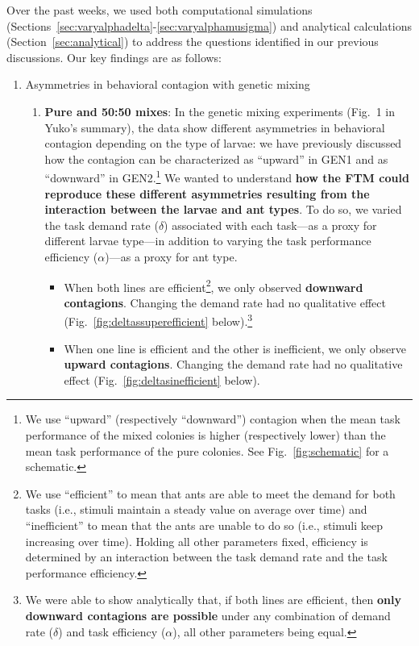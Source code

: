 \documentclass[11pt]{article}
\begin{document}
\noindent Over the past weeks, we used both computational simulations (Sections~\ref{sec:varyalphadelta}-\ref{sec:varyalphamusigma}) and analytical calculations (Section~\ref{sec:analytical}) to address the questions identified in our previous discussions. Our key findings are as follows:
\begin{enumerate}
    \item Asymmetries in behavioral contagion with genetic mixing
    \begin{enumerate}
    \item \textbf{Pure and 50:50 mixes}:
    In the genetic mixing experiments (Fig.~1 in Yuko's summary), the data show different asymmetries in behavioral contagion depending on the type of larvae: we have previously discussed how the contagion can be characterized as  ``upward'' in GEN1 and as ``downward'' in GEN2.\footnote{We use ``upward'' (respectively ``downward'') contagion when the mean task performance of the mixed colonies is higher (respectively lower) than the mean task performance of the pure colonies. See Fig.~\ref{fig:schematic} for a schematic.} We wanted to understand \textbf{how the FTM could reproduce these different asymmetries resulting from the interaction between the larvae and ant types}. To do so, we varied the task demand rate ($\delta$) associated with each task---as a proxy for different larvae type---in addition to varying the task performance efficiency ($\alpha$)---as a proxy for ant type. 
    \begin{itemize}
        
        \item 
        When both lines are efficient\footnote{We use ``efficient'' to mean that ants are able to meet the demand for both tasks (i.e., stimuli maintain a steady value on average over time) and ``inefficient'' to mean that the ants are unable to do so (i.e., stimuli keep increasing over time). Holding all other parameters fixed, efficiency is determined by an interaction between the task demand rate and the task performance efficiency.}, we only observed \textbf{downward contagions}. Changing the demand rate had no qualitative effect (Fig.~\ref{fig:deltassuperefficient} below).\footnote{We were able to show analytically that, if both lines are efficient, then \textbf{only downward contagions are possible} under any combination of demand rate ($\delta$) and task efficiency ($\alpha$), all other parameters being equal.}
       
        \item 
        When one line is efficient and the other is inefficient, we only observe \textbf{upward contagions}. Changing the demand rate had no qualitative effect (Fig.~\ref{fig:deltasinefficient} below). 
        

\end{itemize}
\end{enumerate}
\end{enumerate}
\end{document}
